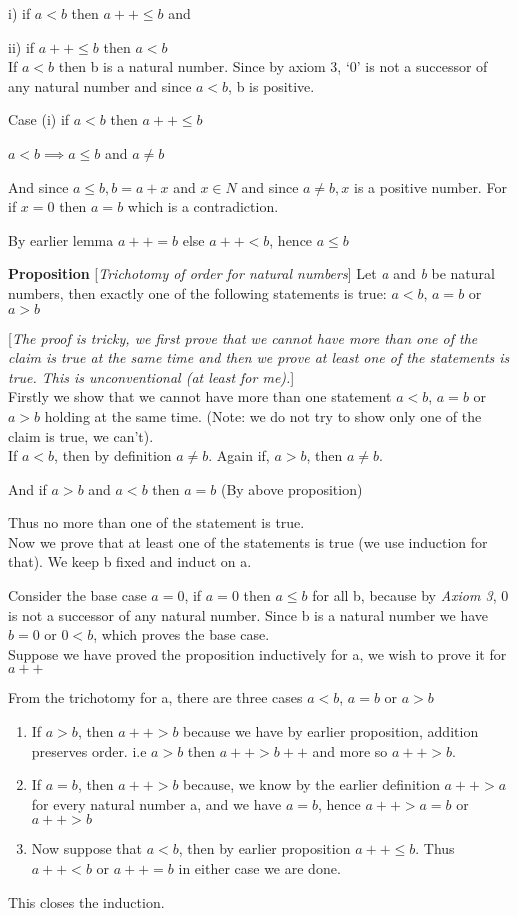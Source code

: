 \documentclass[10pt]{article}
\begin{document}
i)  if $a < b$ then $a++ \leq b$ and

ii) if $a++ \leq b$ then $a < b$
\\[4pt]
If $a < b$ then b is a natural number. Since by axiom 3, `0' is not a successor
of any natural number and since $a<b$, b is positive.

Case (i)  if $a < b$ then $a++ \leq b$

$a<b \implies a \leq b$ and $a \neq b$

And since $a \leq b, b = a+x$ and $x \in N$ and since $a \ne b, x$ is a positive
number. For if $x=0$ then $a=b$ which is a contradiction.

By earlier lemma $a++ = b$ else $a++ < b$, hence $a \leq b$

\flushleft
\newpage
\textbf{Proposition} [\emph{Trichotomy of order for natural numbers}]
Let {\em a} and {\em b} be natural numbers, then exactly one of the following
statements is true: $a < b$, $a = b$ or $a > b$

[\emph{The proof is tricky, we first prove that we cannot have more than one of
    the claim is true at the same time and then we prove at least one of the
    statements is true. This is unconventional (at least for me).}]
\\[5pt]
Firstly we show that we cannot have more than one statement $a < b$, $a = b$
or $a > b$ holding at the same time. (Note: we do not try to show only one of
the claim is true, we can't).
\\[3pt]
If $a < b$, then by definition $a \ne b$. Again if, $a > b$, then $a \ne b$.

And if $a>b$ and $a<b$ then $a = b$ (By above proposition)

Thus no more than one of the statement is true.
\\[4pt]
Now we prove that at least one of the statements is true (we use induction for
that). We keep b fixed and induct on a.

Consider the base case $a = 0$, if $a=0$ then $a \leq b$ for all b, because by
\emph{Axiom 3}, 0 is not a successor of any natural number. Since b is a natural
number we have $b=0$ or $0<b$, which proves the base case.
\\[4pt]
Suppose we have proved the proposition inductively for a, we wish to prove it
for $a++$

From the trichotomy for a, there are three cases $a < b$, $a = b$ or $a > b$
\begin{enumerate}
\item If $a>b$, then $a++ > b$ because we have by earlier proposition, addition
  preserves order. i.e $a>b$ then $a++ > b++$ and more so $a++ > b$.

\item If $a = b$, then $a++ > b$ because, we know by the earlier definition $a++
  > a$ for every natural number a, and we have $a=b$, hence $a++>a=b$ or $a++>b$

\item Now suppose that $a<b$, then by earlier proposition $a++ \leq b$. Thus
  $a++<b$ or $a++=b$ in either case we are done.
\end{enumerate}
This closes the induction.
\end{document}
